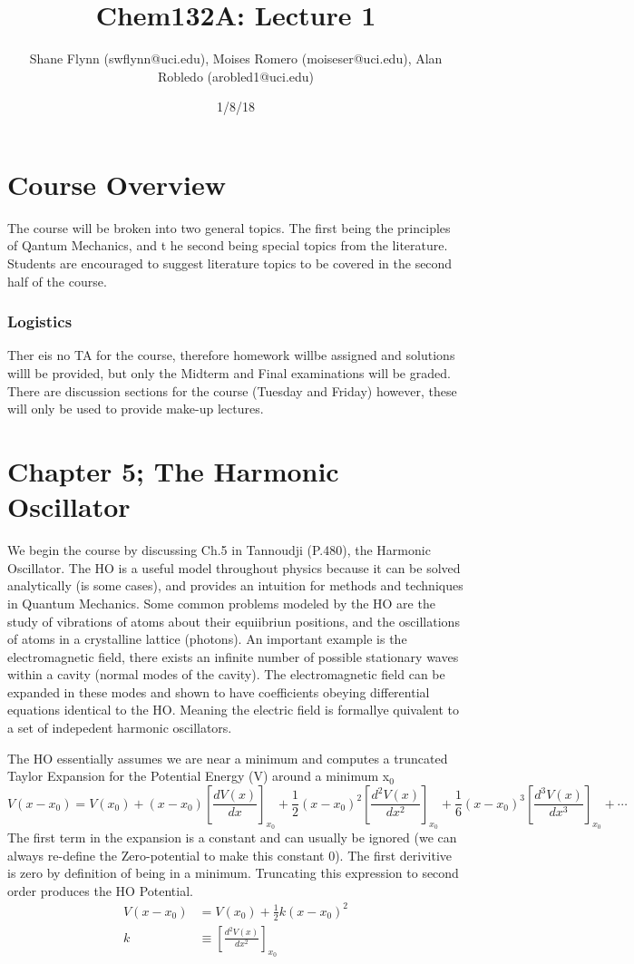\documentclass{article}
\title{Chem132A: Lecture 1}
\author{Shane Flynn (swflynn@uci.edu), Moises Romero (moiseser@uci.edu), Alan Robledo (arobled1@uci.edu)}
\date{1/8/18}
\newcommand{\be}{\begin{equation}}
\newcommand{\ee}{\end{equation}}
\begin{document}
\maketitle

\section*{Course Overview}
The course will be broken into two general topics.
The first being the principles of Qantum Mechanics, and t he second being special topics from the literature.
Students are encouraged to suggest  literature topics to be covered in the second half of the course.

\subsubsection*{Logistics}
Ther eis no TA for the course, therefore homework willbe assigned and solutions willl be provided, but only the Midterm and Final examinations will be graded.
There are discussion sections for the course (Tuesday and Friday) however, these will only be used to provide make-up lectures.

\section*{Chapter 5; The Harmonic Oscillator}
We begin the course by discussing Ch.5 in Tannoudji (P.480), the Harmonic Oscillator.
The HO is a useful model throughout physics because it can be solved analytically (is some cases), and provides an intuition for methods and techniques in Quantum Mechanics.
Some common problems modeled by the HO are the study of vibrations of atoms about their equiibriun positions, and the oscillations of atoms in a crystalline lattice (photons).
An important example is the electromagnetic field, there  exists an  infinite number of possible stationary waves within a cavity (normal modes of the cavity).
The electromagnetic field can be expanded in these modes and shown to have coefficients obeying differential equations identical to the HO.
Meaning the electric field is formallye quivalent to a set of indepedent harmonic oscillators.

The HO essentially assumes we are near a minimum and computes a truncated Taylor Expansion for the Potential Energy (V) around a minimum x$_0$
\be
V(x - x_0) = V(x_0)  + (x-x_0) \left[\frac{dV(x)}{dx}\right]_{x_0} + \frac{1}{2}(x-x_0)^2  \left[\frac{d^2V(x)}{dx^2}\right]_{x_0} + \frac{1}{6} (x-x_0)^3  \left[\frac{d^3V(x)}{dx^3}\right]_{x_0} + \cdots
\ee
The first term in the expansion is a constant and can usually be ignored (we can always re-define the Zero-potential to make this constant 0).
The first derivitive is zero by definition of being in a minimum.
Truncating this expression to second order produces the HO Potential.
\be
\begin{split}
    V(x-x_0) &= V(x_0) +  \frac{1}{2}k(x-x_0)^2\\
    k &\equiv \left[\frac{d^2V(x)}{dx^2}\right]_{x_0}
\end{split}
\ee
\end{document}
